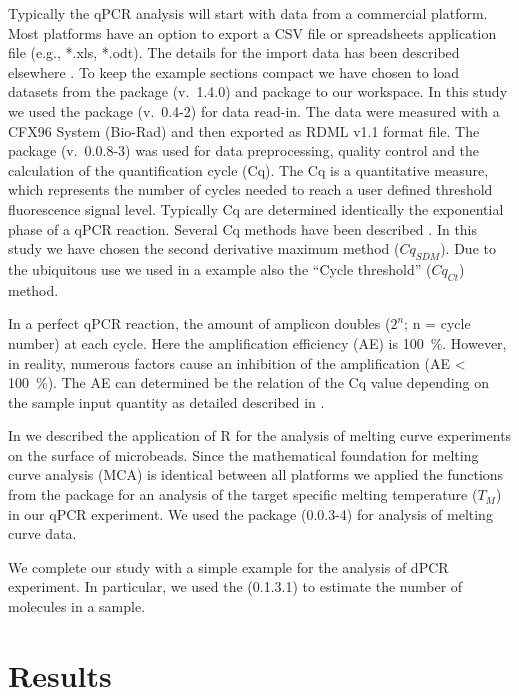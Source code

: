 Typically the qPCR analysis will start with data from a commercial platform. 
Most platforms have an option to export a CSV file or spreadsheets application 
file (e.g., *.xls, *.odt). The details for the import data has been described 
elsewhere \citep{RDCT2010c, rodiger_rkward_2012}. To keep the example sections 
compact we have chosen to load datasets from the  package 
\citep{ritz_2008, spiess_2008} (v.~1.4.0) and  package to our 
workspace. In this study we used the  package (v.~0.4-2) for data 
read-in. The data were measured with a CFX96 System (Bio-Rad) and then exported 
as RDML v1.1 format file. The  package (v.~0.0.8-3) was used 
for data preprocessing, quality control and  the calculation of the 
quantification cycle (Cq). The Cq is a quantitative measure, which represents 
the number of cycles needed to reach a user defined threshold fluorescence 
signal level. Typically Cq are determined identically the exponential phase of a 
qPCR reaction. Several Cq methods have been described \citep{ruijter_2013}. In 
this study we have chosen the second derivative maximum method ($Cq_{SDM}$). Due to 
the ubiquitous use we used in a example also the ``Cycle threshold'' ($Cq_{Ct}$) method.

In a perfect qPCR reaction, the amount of amplicon doubles ($2^{n}$; n = cycle 
number) at each cycle. Here the amplification efficiency (AE) is 100~\%. 
However, in reality, numerous factors cause an inhibition of the amplification 
(AE < 100~\%).  The AE can determined be the relation of the Cq value depending 
on the sample input quantity as detailed described in \citep{roediger_chippcr_2014}.

In \citet{roediger_RJ_2013} we described the application of R for the analysis of 
melting curve experiments on the surface of microbeads. Since the mathematical 
foundation for melting curve analysis (MCA) is identical between all platforms 
we applied the functions from the  package 
\citep{roediger_RJ_2013} for an analysis of the target specific melting 
temperature ($T_{M}$) in our qPCR experiment. We used the  
package (0.0.3-4) for analysis of melting curve data.

We complete our study with a simple example for the analysis of dPCR experiment. 
In particular, we used the  (0.1.3.1) to estimate the number of 
molecules in a sample.

\section{Results}

